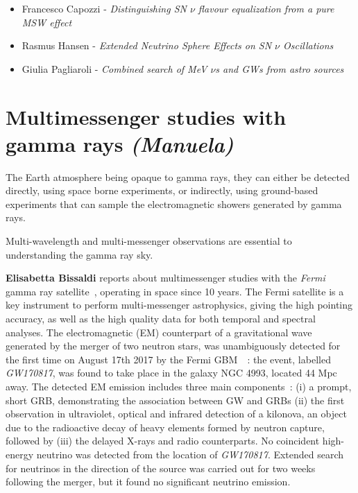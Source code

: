 \documentclass{PoS}
\begin{document}
\begin{itemize}
\item Francesco Capozzi - {\it Distinguishing SN $\nu$ flavour equalization from a pure MSW effect}
\item Rasmus Hansen - {\it Extended Neutrino Sphere Effects on SN $\nu$ Oscillations}
\item Giulia Pagliaroli - {\it Combined search of MeV $\nu$s and GWs from astro sources}
\end{itemize}

\section{Multimessenger studies with gamma rays {\it (Manuela)}}
The Earth atmosphere being opaque to gamma rays, they can either be  detected directly, using space borne experiments, or indirectly, using ground-based experiments that can sample the electromagnetic showers generated by gamma rays. %


Multi-wavelength and multi-messenger observations are 
essential to understanding the gamma ray sky.


{\bf Elisabetta Bissaldi} reports about multimessenger studies with the \textit{Fermi} gamma ray satellite~\cite{Bissaldi}, operating in space since 10 years. 
The Fermi satellite is a key instrument to perform multi-messenger astrophysics, giving the high pointing accuracy, as well as the high quality data for both temporal and spectral analyses. The  electromagnetic (EM) counterpart of a gravitational wave generated by the merger of two neutron stars, was unambiguously detected for the first time on August 17th 2017 by the Fermi GBM~\cite{Gold2017}~\cite{Abbott2017}: the event, labelled \textit{GW170817}, was found to take place in the galaxy NGC 4993, located 44 Mpc away. The detected EM emission includes three main components~\cite{TheMMpaper}: (i) a prompt, short GRB, demonstrating the association between GW and GRBs (ii) the first observation in ultraviolet, optical and infrared detection of a  kilonova, an object  due to the radioactive decay of heavy elements formed by neutron capture, followed by (iii) the delayed X-rays and radio counterparts. 
No coincident high-energy neutrino was detected  from the location of \textit{GW170817}. Extended search for neutrinos in the direction of the source was carried out for two weeks following the merger, but it found no significant neutrino emission. 
\end{document}
